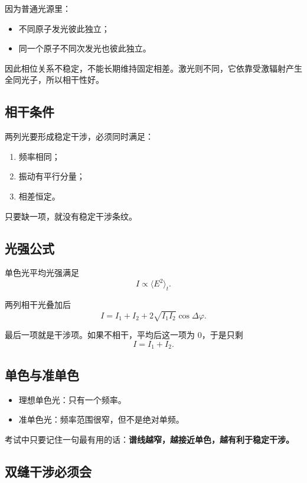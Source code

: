 \documentclass[12pt,a4paper]{article}
\newcommand{\key}[1]{\textcolor{blue!60!black}{\textbf{#1}}}
\begin{document}
因为普通光源里：

\begin{itemize}
  \item 不同原子发光彼此独立；
  \item 同一个原子不同次发光也彼此独立。
\end{itemize}

因此相位关系不稳定，不能长期维持固定相差。激光则不同，它依靠受激辐射产生全同光子，所以相干性好。

\subsection{相干条件}

两列光要形成稳定干涉，必须同时满足：

\begin{enumerate}
  \item 频率相同；
  \item 振动有平行分量；
  \item 相差恒定。
\end{enumerate}

只要缺一项，就没有稳定干涉条纹。

\subsection{光强公式}

单色光平均光强满足
\[
I \propto \langle E^2\rangle_t.
\]

两列相干光叠加后
\[
I = I_1 + I_2 + 2\sqrt{I_1I_2}\cos\Delta\varphi.
\]

最后一项就是干涉项。如果不相干，平均后这一项为 0，于是只剩
\[
I = I_1 + I_2.
\]

\subsection{单色与准单色}

\begin{itemize}
  \item 理想单色光：只有一个频率。
  \item 准单色光：频率范围很窄，但不是绝对单频。
\end{itemize}

考试中只要记住一句最有用的话：\key{谱线越窄，越接近单色，越有利于稳定干涉。}

\subsection{双缝干涉必须会}
\end{document}

